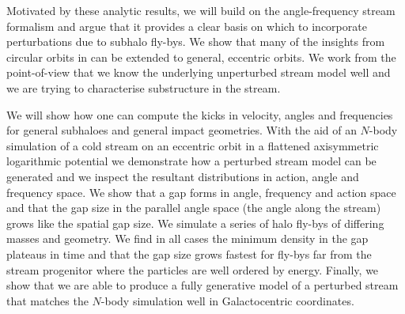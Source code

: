 \documentclass[useAMS,usenatbib,fleqn,a4paper]{mn2e}
\begin{document}
Motivated by these analytic results, we will build on the angle-frequency stream formalism and argue that it provides a clear basis on which to incorporate perturbations due to subhalo fly-bys. We show that many of the insights from circular orbits in \cite{ErkalBelokurov2015} can be extended to general, eccentric orbits. We work from the point-of-view that we know the underlying unperturbed stream model well and we are trying to characterise substructure in the stream.

We will show how one can compute the kicks in velocity, angles and frequencies for general subhaloes and general impact geometries. With the aid of an $N$-body simulation of a cold stream on an eccentric orbit in a flattened axisymmetric logarithmic potential we demonstrate how a perturbed stream model can be generated and we inspect the resultant distributions in action, angle and frequency space. We show that a gap forms in angle, frequency and action space and that the gap size in the parallel angle space (the angle along the stream) grows like the spatial gap size. We simulate a series of halo fly-bys of differing masses and geometry. We find in all cases the minimum density in the gap plateaus in time and that the gap size grows fastest for fly-bys far from the stream progenitor where the particles are well ordered by energy. Finally, we show that we are able to produce a fully generative model of a perturbed stream that matches the $N$-body simulation well in Galactocentric coordinates.
\end{document}
